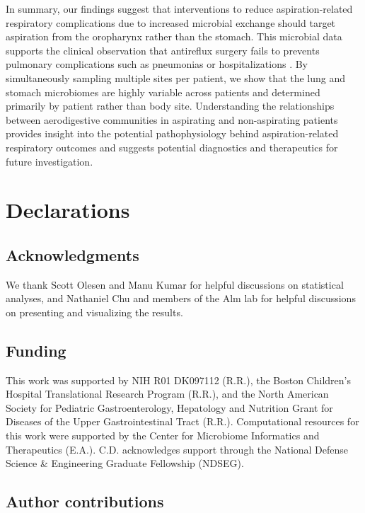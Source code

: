 \documentclass{article}
\begin{document}
In summary, our findings suggest that interventions to reduce aspiration-related respiratory complications due to increased microbial exchange should target aspiration from the oropharynx rather than the stomach.
This microbial data supports the clinical observation that antireflux surgery fails to prevents pulmonary complications such as pneumonias or hospitalizations \cite{barnhart2013fundo,lee2008fundo,goldin2006fundo,yeh2016,srivastava2009fundo}.
By simultaneously sampling multiple sites per patient, we show that the lung and stomach microbiomes are highly variable across patients and determined primarily by patient rather than body site.
Understanding the relationships between aerodigestive communities in aspirating and non-aspirating patients provides insight into the potential pathophysiology behind aspiration-related respiratory outcomes and suggests potential diagnostics and therapeutics for future investigation.

\section{Declarations}

\subsection{Acknowledgments}

We thank Scott Olesen and Manu Kumar for helpful discussions on statistical analyses, and Nathaniel Chu and members of the Alm lab for helpful discussions on presenting and visualizing the results.

\subsection{Funding}

This work was supported by NIH R01 DK097112 (R.R.), the Boston Children's Hospital Translational Research Program (R.R.), and the North American Society for Pediatric Gastroenterology, Hepatology and Nutrition Grant for Diseases of the Upper Gastrointestinal Tract (R.R.).
Computational resources for this work were supported by the Center for Microbiome Informatics and Therapeutics (E.A.).
C.D. acknowledges support through the National Defense Science \& Engineering Graduate Fellowship (NDSEG).

\subsection{Author contributions}
\end{document}
